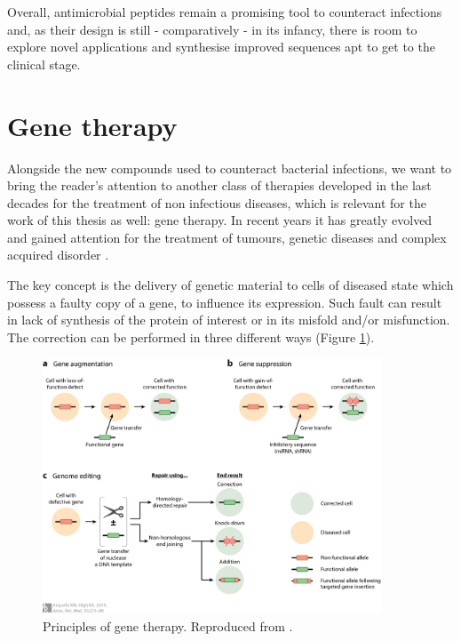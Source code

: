 Overall, antimicrobial peptides remain a promising tool to counteract infections and, as their design is still - comparatively - in its infancy, there is room to explore novel applications and synthesise improved sequences apt to get to the clinical stage.


\section{Gene therapy} \label{sec:gene_th}
Alongside the new compounds used to counteract bacterial infections, we want to bring the reader's attention to another class of therapies developed in the last decades for the treatment of non infectious diseases, which is relevant for the work of this thesis as well: gene therapy. In recent years it has greatly evolved and gained attention for the treatment of tumours, genetic diseases and complex acquired disorder \cite{Anguela2019}.

The key concept is the delivery of genetic material to cells of diseased state which possess a faulty copy of a gene, to influence its expression. Such fault can result in lack of synthesis of the protein of interest or in its misfold and/or misfunction. The correction can be performed in three different ways (Figure \ref{fig:gene_therapy}).

\begin{figure}
\begin{center}
\includegraphics[width = 0.9\textwidth]{1introduction/pics/gene_therapy.jpeg}
\caption[Principles of gene therapy]{Principles of gene therapy. Reproduced from \cite{Anguela2019}.} \label{fig:gene_therapy}
\end{center}
\end{figure}

